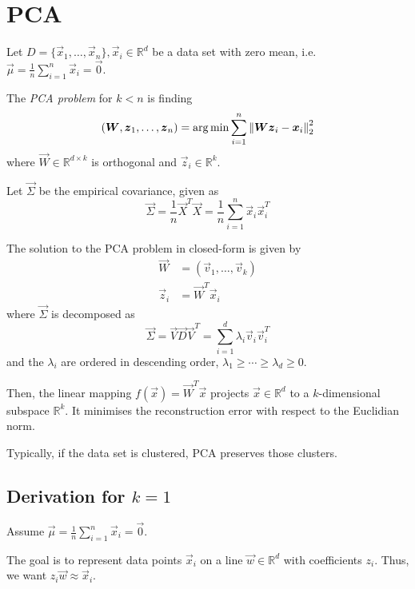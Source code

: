 \section{PCA}
Let
$D = \{\vec{x}_1, \dotsc, \vec{x}_n\}, \vec{x}_i \in \mathbb{R}^d$
be a data set with zero mean,
i.e. $\vec{\mu} = \frac{1}{n} \sum_{i=1}^n{\vec{x}_i} = \vec{0}$.

The \emph{PCA problem} for $k < n$ is finding
\begin{equation*}
    (\boldsymbol{W}, \boldsymbol{z}_1, \dotsc, \boldsymbol{z}_n) = \arg\min{
        \sum_{i=1}^n{\left\lVert\boldsymbol{W} \boldsymbol{z}_i - \boldsymbol{x}_i\right\rVert_2^2}
    }
\end{equation*}
where $\vec{W} \in \mathbb{R}^{d \times k}$ is orthogonal and
$\vec{z}_i \in \mathbb{R}^k$.

Let $\vec{\Sigma}$ be the empirical covariance, given as
\begin{equation*}
    \vec{\Sigma} =
    \frac{1}{n} \vec{X}^T \vec{X} =
    \frac{1}{n} \sum_{i=1}^n{
        \vec{x}_i \vec{x}_i^T
    }
\end{equation*}

The solution to the PCA problem in closed-form is given by
\begin{align*}
    \vec{W} &= (\vec{v}_1, \dotsc, \vec{v}_k) \\
    \vec{z}_i &= \vec{W}^T \vec{x}_i
\end{align*}
where $\vec{\Sigma}$ is decomposed as
\begin{equation*}
    \vec{\Sigma} = \vec{V} \vec{D} \vec{V}^T
    = \sum_{i=1}^d{\lambda_i \vec{v}_i \vec{v}_i^T}
\end{equation*}
and the $\lambda_i$ are ordered in descending order,
$\lambda_1 \geq \dotsb \geq \lambda_d \geq 0$.

Then, the linear mapping $f(\vec{x}) = \vec{W}^T \vec{x}$
projects $\vec{x} \in \mathbb{R}^d$ to a $k$-dimensional
subspace $\mathbb{R}^k$.
It minimises the reconstruction error with respect to
the Euclidian norm.

Typically, if the data set is clustered,
PCA preserves those clusters.


\subsection{Derivation for $k = 1$}
Assume $\vec{\mu} = \frac{1}{n} \sum_{i=1}^n{\vec{x}_i} = \vec{0}$.

The goal is to represent data points $\vec{x}_i$ on a line
$\vec{w} \in \mathbb{R}^d$ with coefficients $z_i$.
Thus, we want $z_i \vec{w} \approx \vec{x}_i$.

